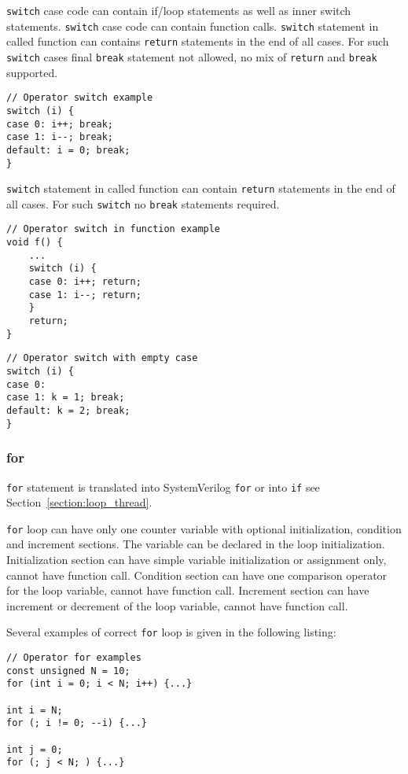 {\tt switch} case code can contain if/loop statements as well as inner switch statements. {\tt switch} case code can contain function calls. {\tt switch} statement in called function can contains {\tt return} statements in the end of all cases. For such {\tt switch} cases final {\tt break} statement not allowed, no mix of {\tt return} and {\tt break} supported.

\begin{lstlisting}[style=mycpp]
// Operator switch example
switch (i) {
case 0: i++; break;
case 1: i--; break;
default: i = 0; break;
}
\end{lstlisting}


{\tt switch} statement in called function can contain {\tt return} statements in the end of all cases. For such {\tt switch} no {\tt break} statements required.

\begin{lstlisting}[style=mycpp]
// Operator switch in function example
void f() {
    ...
    switch (i) {
    case 0: i++; return;
    case 1: i--; return;
    }
    return;
}
\end{lstlisting}


\begin{lstlisting}[style=mycpp]
// Operator switch with empty case
switch (i) {
case 0: 
case 1: k = 1; break;
default: k = 2; break;
}
\end{lstlisting}


\subsubsection{for}

{\tt for} statement is translated into SystemVerilog {\tt for} or into {\tt if} see Section~\ref{section:loop_thread}. 

{\tt for} loop can have only one counter variable with optional initialization, condition and increment sections. The variable can be declared in the loop initialization. 
Initialization section can have simple variable initialization or assignment only, cannot have function call.
Condition section can have one comparison operator for the loop variable, cannot have function call.
Increment section can have increment or decrement of the loop variable, cannot have function call. 

Several examples of correct {\tt for} loop is given in the following listing:
%
\begin{lstlisting}[style=mycpp]
// Operator for examples
const unsigned N = 10;
for (int i = 0; i < N; i++) {...}

int i = N;
for (; i != 0; --i) {...}

int j = 0;
for (; j < N; ) {...}
\end{lstlisting}

